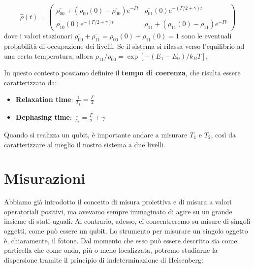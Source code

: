 \begin{esempio}
\begin{equation*}
    \hat \rho(t) =
    \begin{pmatrix}
        \overline{\rho_{00}} + (\rho_{00}(0)-\overline{\rho_{00}})e^{-\Gamma t} & \overline{\rho_{01}}(0)e^{-(\Gamma/2+\gamma) t} \\
        \overline{\rho_{10}}(0)e^{-(\Gamma/2+\gamma) t} &
        \overline{\rho_{11}} + (\rho_{11}(0)-\overline{\rho_{11}})e^{-\Gamma t}
    \end{pmatrix}
\end{equation*}
dove i valori stazionari $\overline{\rho_{00}}+\overline{\rho_{11}}=\rho_{00}(0)+\rho_{11}(0)=1$ sono le eventuali probabilità di occupazione dei livelli. Se il sistema si rilassa verso l'equilibrio ad una certa temperatura, allora $\rho_{11}/\rho_{00} = \exp[-(E_1-E_0)/k_BT]$,
\end{esempio}
\noindent In questo contesto possiamo definire il \textbf{tempo di coerenza}, che risulta essere caratterizzato da:
\begin{itemize}
    \item \textbf{Relaxation time}: $\frac{1}{T_1}=\frac{\Gamma}{2}$
    \item \textbf{Dephasing time}: $\frac{1}{T_2}=\frac{\Gamma}{2} + \gamma$
\end{itemize}
Quando si realizza un qubit, è importante andare a misurare $T_1$ e $T_2$, così da caratterizzare al meglio il nostro sistema a due livelli.

\chapter{Misurazioni}
Abbiamo già introdotto il concetto di misura proiettiva e di misura a valori operatoriali positivi, ma avevamo sempre immaginato di agire su un grande insieme di stati uguali. Al contrario, adesso, ci concentreremo su misure di singoli oggetti, come può essere un qubit.
Lo strumento per misurare un singolo oggetto è, chiaramente, il fotone. Dal momento che esso può essere descritto sia come particella che come onda, più o meno localizzata, potremo studiarne la dispersione tramite il principio di indeterminazione di Heisenberg:

